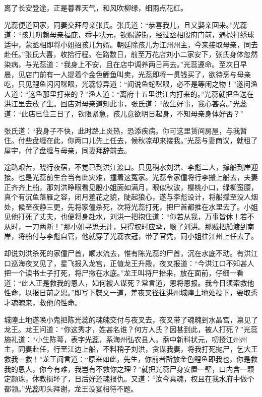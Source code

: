 \documentclass[12pt]{lsbook}
\begin{document}
离了长安登途，正是暮春天气，和风吹柳绿，细雨点花红。

光蕊便道回家，同妻交拜母亲张氏。张氏道：“恭喜我儿，且又娶亲回来。”光蕊道：“孩儿叨赖母亲福庇，忝中状元，钦赐游街，经过丞相殷府门前，遇抛打绣球适中，蒙丞相即将小姐招孩儿为婿。朝廷除孩儿为江州州主，今来接取母亲，同去赴任。”张氏大喜，收拾行程。在路数日，前至万花店刘小二家安下，张氏身体忽然染病，与光蕊道：“我身上不安，且在店中调养两日再去。”光蕊遵命。至次日早晨，见店门前有一人提着个金色鲤鱼叫卖，光蕊即将一贯钱买了，欲待烹与母亲吃，只见鲤鱼闪闪咪眼，光蕊惊异道：“闻说鱼蛇咪眼，必不是等闲之物！”遂问渔人道：“这鱼那里打来的？”渔人道：“离府十五里洪江内打来的。”光蕊就把鱼送在洪江里去放了生。回店对母亲道知此事，张氏道：“放生好事，我心甚喜。”光蕊道：“此店已住三日了，钦限紧急，孩儿意欲明日起身，不知母亲身体好否？”

张氏道：“我身子不快，此时路上炎热，恐添疾病。你可这里赁间房屋，与我暂住。付些盘缠在此，你两口儿先上任去，候秋凉却来接我。”光蕊与妻商议，就租了屋宇，付了盘缠与母亲，同妻拜辞前去。

途路艰苦，晓行夜宿，不觉已到洪江渡口。只见稍水刘洪、李彪二人，撑船到岸迎接。也是光蕊前生合当有此灾难，撞着这冤家。光蕊令家僮将行李搬上船去，夫妻正齐齐上船，那刘洪睁眼看见殷小姐面如满月，眼似秋波，樱桃小口，绿柳蛮腰，真个有沉鱼落雁之容，闭月羞花之貌，陡起狼心，遂与李彪设计，将船撑至没人烟处，候至夜静三更，先将家僮杀死，次将光蕊打死，把尸首都推在水里去了。小姐见他打死了丈夫，也便将身赴水，刘洪一把抱住道：“你若从我，万事皆休！若不从时，一刀两断！”那小姐寻思无计，只得权时应承，顺了刘洪。那贼把船渡到南岸，将船付与李彪自管，他就穿了光蕊衣冠，带了官凭，同小姐往江州上任去了。

却说刘洪杀死的家僮尸首，顺水流去，惟有陈光蕊的尸首，沉在水底不动。有洪江口巡海夜叉见了，星飞报入龙宫，正值龙王升殿，夜叉报道：“今洪江口不知甚人把一个读书士子打死，将尸撇在水底。”龙王叫将尸抬来，放在面前，仔细一看道：“此人正是救我的恩人，如何被人谋死？常言道，恩将恩报。我今日须索救他性命，以报日前之恩。”即写下牒文一道，差夜叉径往洪州城隍土地处投下，要取秀才魂魄来，救他的性命。

城隍土地遂唤小鬼把陈光蕊的魂魄交付与夜叉去，夜叉带了魂魄到水晶宫，禀见了龙王。龙王问道：“你这秀才，姓甚名谁？何方人氏？因甚到此，被人打死？”光蕊施礼道：“小生陈萼，表字光蕊，系海州弘农县人。忝中新科状元，叨授江州州主，同妻赴任，行至江边上船，不料稍子刘洪，贪谋我妻，将我打死抛尸，乞大王救我一救！”龙王闻言道：“原来如此，先生，你前者所放金色鲤鱼即我也，你是救我的恩人，你今有难，我岂有不救你之理？”就把光蕊尸身安置一壁，口内含一颗定颜珠，休教损坏了，日后好还魂报仇。又道：“汝今真魂，权且在我水府中做个都领。”光蕊叩头拜谢，龙王设宴相待不题。
\end{document}
